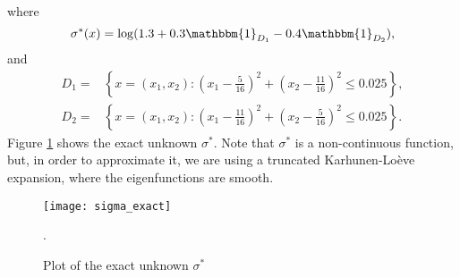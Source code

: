 where
\begin{equation*}
\sigma^*(x) = \log (1.3 + 0.3 \mathbbm{1}_{D_1} - 0.4 \mathbbm{1}_{D_2}),
\end{equation*}
and
\begin{align*}
D_1 = & \left \{ x = (x_1,x_2) \colon \left ( x_1 - \frac{5}{16} \right )^2 + \left ( x_2 - \frac{11}{16} \right )^2 \le 0.025 \right \}, \\
D_2 = & \left \{ x = (x_1,x_2) \colon \left ( x_1 - \frac{11}{16} \right )^2 + \left ( x_2 - \frac{5}{16} \right )^2 \le 0.025 \right \}.
\end{align*}
Figure \ref{fig:exact_unknown} shows the exact unknown $\sigma^*$. Note that $\sigma^*$ is a non-continuous function, but, in order to approximate it, we are using a truncated Karhunen-Lo\`eve expansion, where the eigenfunctions are smooth.

\begin{figure}[t]
	\centering
	\texttt{[image: sigma\_exact]}
	\caption{Plot of the exact unknown $\sigma^*$}.
	\label{fig:exact_unknown}
\end{figure}

